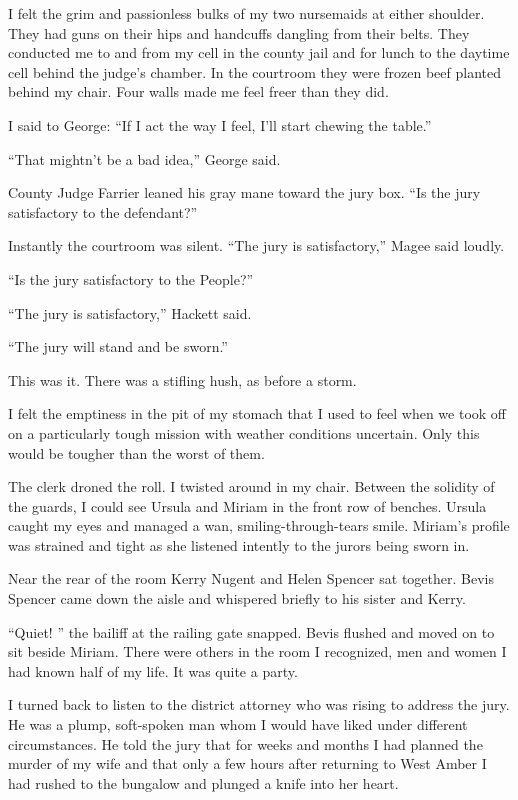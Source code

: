 \documentclass{novel}
\begin{document}
I felt the grim and passionless bulks of my two nursemaids at either shoulder. They had guns on their hips and handcuffs dangling from their belts. They conducted me to and from my cell in the county jail and for lunch to the daytime cell behind the judge’s chamber. In the courtroom they were frozen beef planted behind my chair. Four walls made me feel freer than they did.

I said to George: “If I act the way I feel, I’ll start chewing the table.”

“That mightn’t be a bad idea,” George said.

County Judge Farrier leaned his gray mane toward the jury box. “Is the jury satisfactory to the defendant?”

Instantly the courtroom was silent. “The jury is satisfactory,” Magee said loudly.

“Is the jury satisfactory to the People?”

“The jury is satisfactory,” Hackett said.

“The jury will stand and be sworn.”

\scenestars

This was it. There was a stifling hush, as before a storm. 

I felt the emptiness in the pit of my stomach that I used to feel when we took off on a particularly tough mission with weather conditions uncertain. Only this would be tougher than the worst of them.

The clerk droned the roll. I twisted around in my chair. Between the solidity of the guards, I could see Ursula and Miriam in the front row of benches. Ursula caught my eyes and managed a wan, smiling-through-tears smile. Miriam’s profile was strained and tight as she listened intently to the jurors being sworn in.

Near the rear of the room Kerry Nugent and Helen Spencer sat together. Bevis Spencer came down the aisle and whispered briefly to his sister and Kerry.

“Quiet! ” the bailiff at the railing gate snapped. Bevis flushed and moved on to sit beside Miriam. There were others in the room I recognized, men and women I had known half of my life. It was quite a party.

I turned back to listen to the district attorney who was rising to address the jury. He was a plump, soft-spoken man whom I would have liked under different circumstances. He told the jury that for weeks and months I had planned the murder of my wife and that only a few hours after returning to West Amber I had rushed to the bungalow and plunged a knife into her heart.
\end{document}
